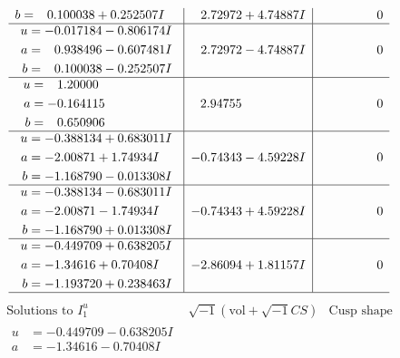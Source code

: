 \documentclass[1p]{elsarticle_modified}
\theoremstyle{definition}
\newcommand{\I}{\sqrt{-1}}
\begin{document}
$$\begin{array}{c|c|c}
\begin{aligned}
b &= \phantom{-}0.100038 + 0.252507 I\end{aligned}
 & \phantom{-}2.72972 + 4.74887 I & \phantom{-0.000000 } 0 \\ \hline\begin{aligned}
u &= -0.017184 - 0.806174 I \\
a &= \phantom{-}0.938496 - 0.607481 I \\
b &= \phantom{-}0.100038 - 0.252507 I\end{aligned}
 & \phantom{-}2.72972 - 4.74887 I & \phantom{-0.000000 } 0 \\ \hline\begin{aligned}
u &= \phantom{-}1.20000\phantom{ +0.000000I} \\
a &= -0.164115\phantom{ +0.000000I} \\
b &= \phantom{-}0.650906\phantom{ +0.000000I}\end{aligned}
 & \phantom{-}2.94755\phantom{ +0.000000I} & \phantom{-0.000000 } 0 \\ \hline\begin{aligned}
u &= -0.388134 + 0.683011 I \\
a &= -2.00871 + 1.74934 I \\
b &= -1.168790 - 0.013308 I\end{aligned}
 & -0.74343 - 4.59228 I & \phantom{-0.000000 } 0 \\ \hline\begin{aligned}
u &= -0.388134 - 0.683011 I \\
a &= -2.00871 - 1.74934 I \\
b &= -1.168790 + 0.013308 I\end{aligned}
 & -0.74343 + 4.59228 I & \phantom{-0.000000 } 0 \\ \hline\begin{aligned}
u &= -0.449709 + 0.638205 I \\
a &= -1.34616 + 0.70408 I \\
b &= -1.193720 + 0.238463 I\end{aligned}
 & -2.86094 + 1.81157 I & \phantom{-0.000000 } 0\\
 \hline 
 \end{array}$$\newpage$$\begin{array}{c|c|c}  
\text{Solutions to }I^u_{1}& \I (\text{vol} + \sqrt{-1}CS) & \text{Cusp shape}\\
 \hline 
\begin{aligned}
u &= -0.449709 - 0.638205 I \\
a &= -1.34616 - 0.70408 I \\

\end{aligned}
\end{array}$$
\end{document}
